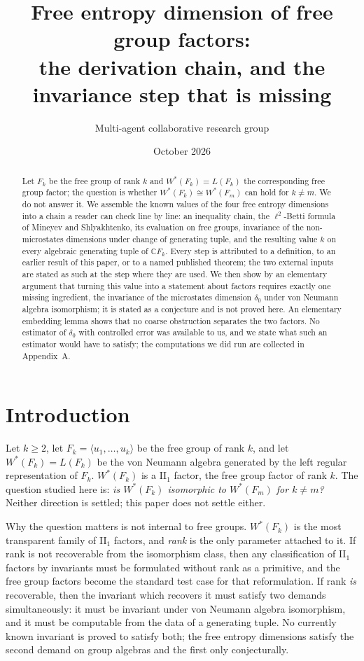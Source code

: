 \documentclass[11pt]{article}
\title{Free entropy dimension of free group factors:\\ the derivation chain, and the invariance step that is missing}
\author{Multi-agent collaborative research group}
\date{October 2026}
\theoremstyle{plain}
\theoremstyle{definition}
\theoremstyle{remark}
\newcommand{\C}{\mathbb{C}}\newcommand{\N}{\mathbb{N}}
\begin{document}
\maketitle

\begin{abstract}
Let $F_k$ be the free group of rank $k$ and $W^*(F_k)=L(F_k)$ the corresponding free group factor; the question is whether $W^*(F_k)\cong W^*(F_m)$ can hold for $k\neq m$. We do not answer it. We assemble the known values of the four free entropy dimensions into a chain a reader can check line by line: an inequality chain, the $\ell^2$-Betti formula of Mineyev and Shlyakhtenko, its evaluation on free groups, invariance of the non-microstates dimensions under change of generating tuple, and the resulting value $k$ on every algebraic generating tuple of $\C F_k$. Every step is attributed to a definition, to an earlier result of this paper, or to a named published theorem; the two external inputs are stated as such at the step where they are used. We then show by an elementary argument that turning this value into a statement about factors requires exactly one missing ingredient, the invariance of the microstates dimension $\delta_0$ under von Neumann algebra isomorphism; it is stated as a conjecture and is not proved here. An elementary embedding lemma shows that no coarse obstruction separates the two factors. No estimator of $\delta_0$ with controlled error was available to us, and we state what such an estimator would have to satisfy; the computations we did run are collected in Appendix~A.
\end{abstract}

\section{Introduction}

Let $k\ge 2$, let $F_k=\langle u_1,\dots,u_k\rangle$ be the free group of rank $k$, and let $W^*(F_k)=L(F_k)$ be the von Neumann algebra generated by the left regular representation of $F_k$. $W^*(F_k)$ is a II$_1$ factor, the free group factor of rank $k$. The question studied here is: \emph{is $W^*(F_k)$ isomorphic to $W^*(F_m)$ for $k\neq m$?} Neither direction is settled; this paper does not settle either.

Why the question matters is not internal to free groups. $W^*(F_k)$ is the most transparent family of II$_1$ factors, and \emph{rank} is the only parameter attached to it. If rank is not recoverable from the isomorphism class, then any classification of II$_1$ factors by invariants must be formulated without rank as a primitive, and the free group factors become the standard test case for that reformulation. If rank \emph{is} recoverable, then the invariant which recovers it must satisfy two demands simultaneously: it must be invariant under von Neumann algebra isomorphism, and it must be computable from the data of a generating tuple. No currently known invariant is proved to satisfy both; the free entropy dimensions satisfy the second demand on group algebras and the first only conjecturally.
\end{document}
